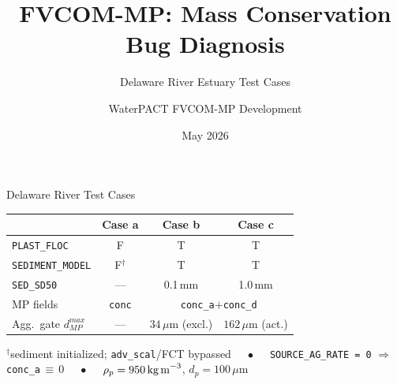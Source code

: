 \documentclass[aspectratio=169,10pt]{beamer}
\title{FVCOM-MP: Mass Conservation Bug Diagnosis}
\subtitle{Delaware River Estuary Test Cases}
\author{WaterPACT FVCOM-MP Development}
\date{May 2026}
\newcommand{\ca}{\textcolor{OliveGreen}{\textbf{a}}}
\newcommand{\cb}{\textcolor{NavyBlue}{\textbf{b}}}
\newcommand{\cc}{\textcolor{BurntOrange}{\textbf{c}}}
\begin{document}
\begin{frame}
  \titlepage
\end{frame}

\begin{frame}{Delaware River Test Cases}
  \centering
  \vspace{0.5em}
  \footnotesize
  \begin{tabular}{lccc}
    \toprule
    & Case \ca & Case \cb & Case \cc \\
    \midrule
    \texttt{PLAST\_FLOC}   & F & T & T \\
    \texttt{SEDIMENT\_MODEL} & F$^{\dagger}$ & T & T \\
    \texttt{SED\_SD50}     & --- & 0.1\,mm & 1.0\,mm \\
    MP fields     & \texttt{conc} &
                             \multicolumn{2}{c}{\texttt{conc\_a}$+$\texttt{conc\_d}} \\
    Agg.\ gate $d_{MP}^{max}$ & --- &
                             $34\,\mu$m (excl.) &
                             $162\,\mu$m (act.) \\
    \bottomrule
  \end{tabular}

  \vspace{0.6em}
  {$^{\dagger}$sediment initialized; \texttt{adv\_scal}/FCT bypassed
  $\quad\bullet\quad$
  \texttt{SOURCE\_AG\_RATE\,=\,0} $\Rightarrow$ \texttt{conc\_a}\,$\equiv$\,0
  $\quad\bullet\quad$ $\rho_p=950\,\text{kg\,m}^{-3}$,\; $d_p=100\,\mu$m}
\end{frame}
\end{document}
